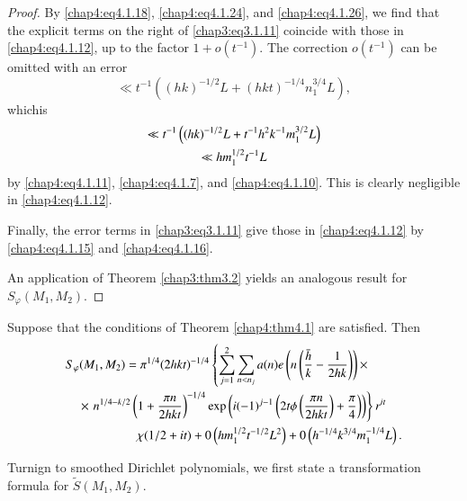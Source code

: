 \begin{proof}
By \eqref{chap4:eq4.1.18}, \eqref{chap4:eq4.1.24}, and
\eqref{chap4:eq4.1.26}, we find that the explicit terms on the right
of \eqref{chap3:eq3.1.11} coincide with those in
\eqref{chap4:eq4.1.12}, up to the factor $1+o(t^{-1})$. The correction
$o(t^{-1})$ can be omitted with an error 
$$
\ll t^{-1}\left((hk)^{-1/2}L+(hkt)^{-1/4}n_1^{3/4}L\right),
$$ 
which\pageoriginale is 
\begin{gather}
\ll t^{-1}\left((hk)^{-1/2}L+t^{-1}h^2k^{-1}m_1^{3/2}L\right)\notag\\
\ll hm_1^{1/2}t^{-1}L\label{chap4:eq4.1.27}
\end{gather}
by \eqref{chap4:eq4.1.11}, \eqref{chap4:eq4.1.7}, and
\eqref{chap4:eq4.1.10}. This is clearly negligible in
\eqref{chap4:eq4.1.12}. 

Finally, the error terms in \eqref{chap3:eq3.1.11} give those in
\eqref{chap4:eq4.1.12} by \eqref{chap4:eq4.1.15} and
\eqref{chap4:eq4.1.16}.

An application of Theorem \ref{chap3:thm3.2} yields an analogous
result for \break $S_\varphi(M_1,M_2)$. 
\end{proof}

\begin{thm}\label{chap4:thm4.2}
Suppose that the conditions of Theorem \ref{chap4:thm4.1} are
satisfied. Then 
\begin{align}
&S_\varphi(M_1,M_2) = \pi^{1/4}(2hkt)^{-1/4}\left\{\sum\limits_{j=1}^2
\sum\limits_{n<n_j}a(n)e\left(n\left(\frac{\bar{h}}{k}-\frac{1}{2hk}
\right)\right)\times\right.\label{chap4:eq4.1.28}\\
&\quad \times \left.n^{1/4-k /2}\left(1+\frac{\pi n}{2hkt}
\right)^{-1/4}\exp\left(i(-1)^{j-1}\left(2t\phi\left(\frac{\pi n}
{2hkt}\right)+\frac{\pi}{4}\right)\right)\right\}r^{it}\notag\\
& \hspace{2cm} \chi (1/2+it)
+0\left(hm_1^{1/2}t^{-1/2}L^2\right)+0\left(h^{-1/4}k^{3/4} 
m_1^{-1/4}L\right).\notag 
\end{align}
\end{thm}

Turnign to smoothed Dirichlet polynomials, we first state a
transformation formula for $\tilde{S}(M_1,M_2)$.

